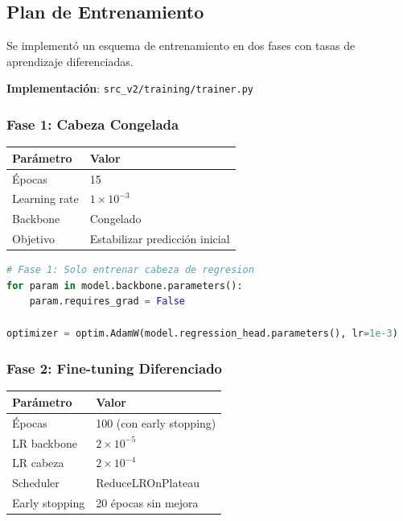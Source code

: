 \documentclass[12pt,a4paper]{article}
\newcommand{\code}[1]{\texttt{#1}}
\begin{document}
\subsection{Plan de Entrenamiento}

Se implementó un esquema de entrenamiento en dos fases con tasas de aprendizaje diferenciadas.

\textbf{Implementación}: \code{src\_v2/training/trainer.py}

\subsubsection{Fase 1: Cabeza Congelada}

\begin{table}[H]
\centering
\begin{tabular}{ll}
\toprule
\textbf{Parámetro} & \textbf{Valor} \\
\midrule
Épocas & 15 \\
Learning rate & $1 \times 10^{-3}$ \\
Backbone & Congelado \\
Objetivo & Estabilizar predicción inicial \\
\bottomrule
\end{tabular}
\end{table}

\begin{lstlisting}[language=Python]
# Fase 1: Solo entrenar cabeza de regresion
for param in model.backbone.parameters():
    param.requires_grad = False

optimizer = optim.AdamW(model.regression_head.parameters(), lr=1e-3)
\end{lstlisting}

\subsubsection{Fase 2: Fine-tuning Diferenciado}

\begin{table}[H]
\centering
\begin{tabular}{ll}
\toprule
\textbf{Parámetro} & \textbf{Valor} \\
\midrule
Épocas & 100 (con early stopping) \\
LR backbone & $2 \times 10^{-5}$ \\
LR cabeza & $2 \times 10^{-4}$ \\
Scheduler & ReduceLROnPlateau \\
Early stopping & 20 épocas sin mejora \\
\bottomrule
\end{tabular}
\end{table}
\end{document}
